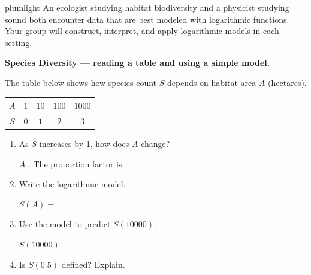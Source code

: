 \documentclass[10pt]{article}
\begin{document}
\namepartnerperiod

\vspace{0.1in}

\begin{scenariobox}{plumlight}
An ecologist studying habitat biodiversity and a physicist studying sound both encounter
data that are best modeled with logarithmic functions. Your group will construct, interpret,
and apply logarithmic models in each setting.
\end{scenariobox}

\vspace{0.1in}

\begin{tcolorbox}[colback=white, colframe=black!40,
    title=\textbf{Tier R --- Remediate},
    fonttitle=\bfseries, arc=2mm, left=3mm, right=3mm, top=2mm, bottom=2mm]

\textbf{Species Diversity --- reading a table and using a simple model.}

\vspace{4pt}
The table below shows how species count $S$ depends on habitat area $A$ (hectares).

\vspace{4pt}
\begin{center}
\renewcommand{\arraystretch}{1.8}
\begin{tabular}{|c|c|c|c|c|}
\hline
\rowcolor{sky}
$A$ & $1$ & $10$ & $100$ & $1000$ \\
\hline
$S$ & $0$ & $1$  & $2$   & $3$ \\
\hline
\end{tabular}
\end{center}

\begin{enumerate}[leftmargin=1.8em, itemsep=10pt]

\item As $S$ increases by 1, how does $A$ change?

\vspace{4pt}
$A$ . The proportion factor is: 

\item Write the logarithmic model.

\vspace{4pt}
$S(A) = $ 

\item Use the model to predict $S(10000)$.

\vspace{4pt}
$S(10000) = $ 

\item Is $S(0.5)$ defined? Explain.


\end{enumerate}
\end{tcolorbox}
\end{document}
